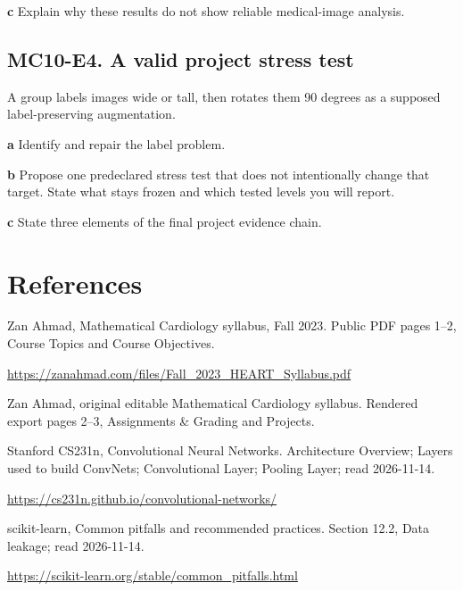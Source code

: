 \documentclass[11pt,letterpaper]{article}
\theoremstyle{definition}\newtheorem{definition}{Definition}\newtheorem{example}{Example}
\numberwithin{equation}{section}
\begin{document}
\textbf{c} Explain why these results do not show reliable medical-image analysis.

\par\noindent\begin{minipage}{\linewidth}
\subsection*{MC10-E4. A valid project stress test}
A group labels images wide or tall, then rotates them 90 degrees as a supposed label-preserving augmentation.

\textbf{a} Identify and repair the label problem.

\end{minipage}\par\medskip
\textbf{b} Propose one predeclared stress test that does not intentionally change that target. State what stays frozen and which tested levels you will report.

\textbf{c} State three elements of the final project evidence chain.

\section*{References}
\noindent\begin{minipage}{\linewidth}
Zan Ahmad, Mathematical Cardiology syllabus, Fall 2023. Public PDF pages 1--2, Course Topics and Course Objectives.

\url{https://zanahmad.com/files/Fall_2023_HEART_Syllabus.pdf}
\end{minipage}\par\medskip
\noindent\begin{minipage}{\linewidth}
Zan Ahmad, original editable Mathematical Cardiology syllabus. Rendered export pages 2--3, Assignments \& Grading and Projects.

\end{minipage}\par\medskip
\noindent\begin{minipage}{\linewidth}
Stanford CS231n, Convolutional Neural Networks. Architecture Overview; Layers used to build ConvNets; Convolutional Layer; Pooling Layer; read 2026-11-14.

\url{https://cs231n.github.io/convolutional-networks/}
\end{minipage}\par\medskip
\noindent\begin{minipage}{\linewidth}
scikit-learn, Common pitfalls and recommended practices. Section 12.2, Data leakage; read 2026-11-14.

\url{https://scikit-learn.org/stable/common_pitfalls.html}
\end{minipage}\par\medskip
\end{document}
